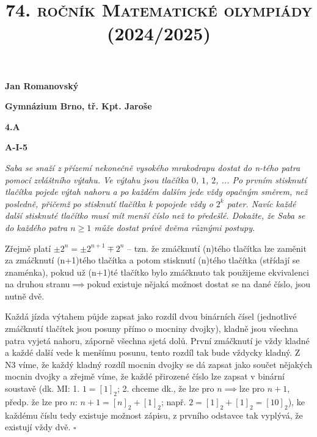\documentclass{article}
\title{\normalsize{\vspace{-2cm}\textsc{74. ročník Matematické olympiády (2024/2025)}\vspace{-1.7cm}}}
\date{}
\author{}
\begin{document}
\maketitle

\textbf{ }

\noindent \textbf{Jan Romanovský}

\noindent \textbf{Gymnázium Brno, tř. Kpt. Jaroše}

\noindent \textbf{4.A}

\noindent \textbf{A-\textrm{I}-5}

\textbf{ }

\textit{Saba se snaží z přízemí nekonečně vysokého mrakodrapu dostat do n-tého patra pomocí zvláštního výtahu. Ve výtahu jsou tlačítka $0$, $1$, $2$, ... Po prvním stisknutí tlačítka pojede výtah nahoru a po každém dalším jede vždy opačným směrem, než posledně, přičemž po stisknutí tlačítka k popojede vždy o $2^k$ pater. Navíc každé další stisknuté tlačítko musí mít menší číslo než to předešlé. Dokažte, že Saba se do každého patra $n \geq 1$ může dostat právě dvěma různými postupy.}

\textbf{ }

Zřejmě platí $\pm 2^n = \pm 2^{n+1} \mp 2^{n}$ -- tzn. že zmáčknutí (n)tého tlačítka lze zaměnit za zmáčknutí (n+1)tého tlačítka a potom stisknutí (n)tého tlačítka (střídají se znaménka), pokud už (n+1)té tlačítko bylo zmáčknuto tak použijeme ekvivalenci na druhou stranu$\implies$pokud existuje nějaká možnost dostat se na dané číslo, jsou nutně dvě.

\textbf{ }

Každá jízda výtahem půjde zapsat jako rozdíl dvou binárních čísel (jednotlivé zmáčknutí tlačítek jsou posuny přímo o mocniny dvojky), kladně jsou všechna patra vyjetá nahoru, záporně všechna sjetá dolů. První zmáčknutí je vždy kladné a každé další vede k menšímu posunu, tento rozdíl tak bude vždycky kladný. Z N3 víme, že každý kladný rozdíl mocnin dvojky se dá zapsat jako součet nějakých mocnin dvojky a zřejmě víme, že každé přirozené číslo lze zapsat v binární soustavě (dk. MI: 1. $1 = [1]_2$; 2. chceme dk., že lze pro $n \implies$lze pro $n+1$, předp. že lze pro $n$: $n+1 = [n]_2 + [1]_2$; např. $2 = [1]_2 + [1]_2 = [10]_2$), ke každému číslu tedy existuje možnost zápisu, z prvního odstavce tak vyplývá, že existují vždy dvě. $\square$
\end{document}
